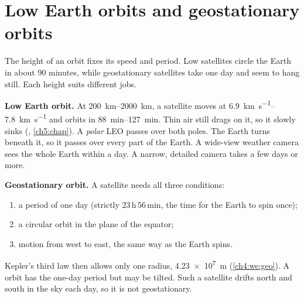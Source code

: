 \section{Low Earth orbits and geostationary orbits}\label{ch4:sec:leogeo}

\begin{bigidea}
The height of an orbit fixes its speed and period. Low satellites circle the Earth in about
90 minutes, while geostationary satellites take one day and seem to hang still. Each height suits
different jobs.
\end{bigidea}

\begin{keywords}
\end{keywords}

\textbf{Low Earth orbit.} At \qtyrange{200}{2000}{km}, a satellite moves at
\qtyrange{6.9}{7.8}{km.s^{-1}} and orbits in \qtyrange{88}{127}{min}. Thin air still drags on it,
so it slowly sinks (, \cref{ch5:chap}). A \emph{polar} LEO passes over both
poles. The Earth turns beneath it, so it passes over every part of the Earth. A wide-view weather
camera sees the whole Earth within a day. A narrow, detailed camera takes a few days or more.

\textbf{Geostationary orbit.} A  satellite needs all three conditions:
\begin{enumerate}
  \item a period of one day (strictly 23\,h\,56\,min, the time for the Earth to spin once);
  \item a circular orbit in the plane of the equator;
  \item motion from west to east, the same way as the Earth spins.
\end{enumerate}
Kepler's third law then allows only one radius, \qty{4.23e7}{m} (\cref{ch4:we:geo}). A
 orbit has the one-day period but may be tilted. Such a satellite drifts
north and south in the sky each day, so it is not geostationary.

